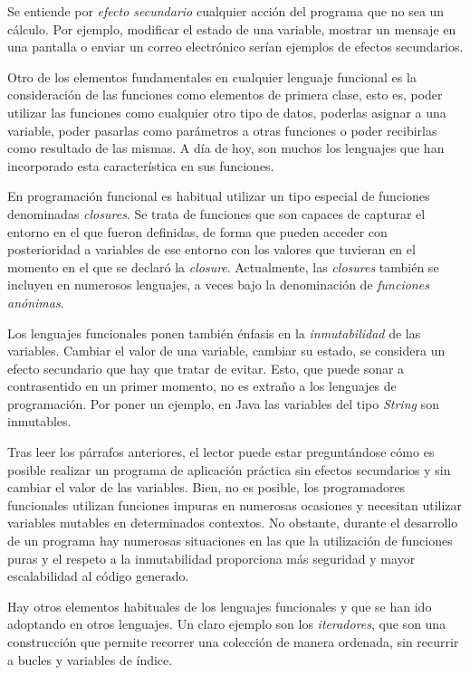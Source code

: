 \documentclass[a4paper,11pt]{extarticle}
\begin{document}
Se entiende por \textit{efecto secundario} cualquier acción del programa que no sea un cálculo. Por ejemplo, modificar el estado de una variable, mostrar un mensaje en una pantalla o enviar un correo electrónico serían ejemplos de efectos secundarios.

Otro de los elementos fundamentales en cualquier lenguaje funcional es la consideración de las funciones como elementos de primera clase, esto es, poder utilizar las funciones como cualquier otro tipo de datos, poderlas asignar a una variable, poder pasarlas como parámetros a otras funciones o poder recibirlas como resultado de las mismas. A día de hoy, son muchos los lenguajes que han incorporado esta característica en sus funciones. 

En programación funcional es habitual utilizar un tipo especial de funciones denominadas \textit{closures}. Se trata de funciones que son capaces de capturar el entorno en el que fueron definidas, de forma que pueden acceder con posterioridad a variables de ese entorno con los valores que tuvieran en el momento en el que se declaró la \textit{closure}. Actualmente, las \textit{closures} también se incluyen en numerosos lenguajes, a veces bajo la denominación de \textit{funciones anónimas}.

Los lenguajes funcionales ponen también énfasis en la \textit{inmutabilidad} de las variables. Cambiar el valor de una variable, cambiar su estado, se considera un efecto secundario que hay que tratar de evitar. Esto, que puede sonar a contrasentido en un primer momento, no es extraño a los lenguajes de programación. Por poner un ejemplo, en Java las variables del tipo \textit{String} son inmutables. 

Tras leer los párrafos anteriores, el lector puede estar preguntándose cómo es posible realizar un programa de aplicación práctica sin efectos secundarios y sin cambiar el valor de las variables. Bien, no es posible, los programadores funcionales utilizan funciones impuras en numerosas ocasiones y necesitan utilizar variables mutables en determinados contextos. No obstante, durante el desarrollo de un programa hay numerosas situaciones en las que la utilización de funciones puras y el respeto a la inmutabilidad proporciona más seguridad y mayor escalabilidad al código generado. 

Hay otros elementos habituales de los lenguajes funcionales y que se han ido adoptando en otros lenguajes. Un claro ejemplo son los \textit{iteradores}, que son una construcción que permite recorrer una colección de manera ordenada, sin recurrir a bucles y variables de índice. 
\end{document}
